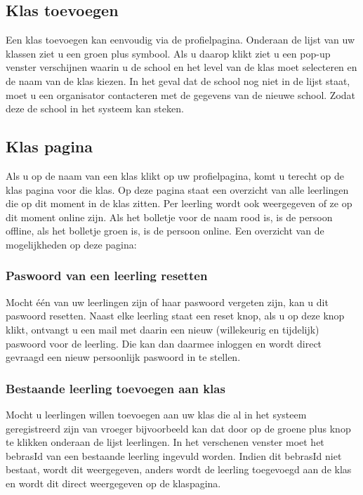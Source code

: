 \documentclass[11pt,a4paper]{report}
\begin{document}
\subsection{Klas toevoegen}
Een klas toevoegen kan eenvoudig via de profielpagina. Onderaan de lijst van uw klassen ziet u een groen plus symbool. Als u daarop klikt ziet u een pop-up venster verschijnen waarin u de school en het level van de klas moet selecteren en de naam van de klas kiezen. In het geval dat de school nog niet in de lijst staat, moet u een organisator contacteren met de gegevens van de nieuwe school. Zodat deze de school in het systeem kan steken.

\subsection{Klas pagina}
Als u op de naam van een klas klikt op uw profielpagina, komt u terecht op de klas pagina voor die klas. Op deze pagina staat een overzicht van alle leerlingen die op dit moment in de klas zitten. Per leerling wordt ook weergegeven of ze op dit moment online zijn. Als het bolletje voor de naam rood is, is de persoon offline, als het bolletje groen is, is de persoon online.
Een overzicht van de mogelijkheden op deze pagina:

\subsubsection{Paswoord van een leerling resetten}
Mocht \'e\'en van uw leerlingen zijn of haar paswoord vergeten zijn, kan u dit paswoord resetten. Naast elke leerling staat een reset knop, als u op deze knop klikt, ontvangt u een mail met daarin een nieuw (willekeurig en tijdelijk) paswoord voor de leerling. Die kan dan daarmee inloggen en wordt direct gevraagd een nieuw persoonlijk paswoord in te stellen.

\subsubsection{Bestaande leerling toevoegen aan klas}
Mocht u leerlingen willen toevoegen aan uw klas die al in het systeem geregistreerd zijn van vroeger bijvoorbeeld kan dat door op de groene plus knop te klikken onderaan de lijst leerlingen. In het verschenen venster moet het bebrasId van een bestaande leerling ingevuld worden. Indien dit bebrasId niet bestaat, wordt dit weergegeven, anders wordt de leerling toegevoegd aan de klas en wordt dit direct weergegeven op de klaspagina.
\end{document}
